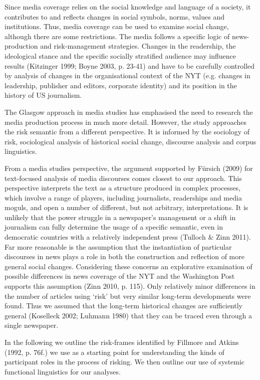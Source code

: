 Since media coverage relies on the social knowledge and language of a society, it contributes to and reflects changes in social symbols, norms, values and institutions. Thus, media coverage can be used to examine social change, although there are some restrictions. The media follows a specific logic of news-production and risk-management strategies. Changes in the readership, the ideological stance and the specific socially stratified audience may influence results (Kitzinger 1999; Boyne 2003, p. 23-41) and have to be carefully controlled by analysis of changes in the organisational context of the NYT (e.g. changes in leadership, publisher and editors, corporate identity) and its position in the history of US journalism. 

The Glasgow approach in media studies has emphasised the need to research the media production process in much more detail. However, the study approaches the risk semantic from a different perspective. It is informed by the sociology of risk, sociological analysis of historical social change, discourse analysis and corpus linguistics. 

From a media studies perspective, the argument supported by F\"{u}rsich (2009) for text-focused analysis of media discourses comes closest to our approach. This perspective interprets the text as a structure produced in complex processes, which involve a range of players, including journalists, readerships and media moguls, and open a number of different, but not arbitrary, interpretations. It is unlikely that the power struggle in a newspaper's management or a shift in journalism can fully determine the usage of a specific semantic, even in democratic countries with a relatively independent press (Tulloch \& Zinn 2011). Far more reasonable is the assumption that the instantiation of particular discourses in news plays a role in both the construction and reflection of more general social changes. Considering these concerns an explorative examination of possible differences in news coverage of the NYT and the Washington Post supports this assumption (Zinn 2010, p. 115). Only relatively minor differences in the number of articles using `risk' but very similar long-term developments were found. Thus we assumed that the long-term historical changes are sufficiently general (Koselleck 2002; Luhmann 1980) that they can be traced even through a single newspaper. 

In the following we outline the risk-frames identified by Fillmore and Atkins (1992, p. 76f.) we use as a starting point for understanding the kinds of participant roles in the process of risking. We then outline our use of systemic functional linguistics for our analyses.

